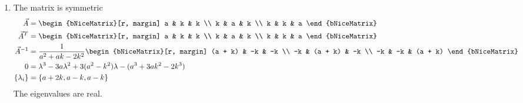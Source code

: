 \begin{enumerate}
    \item The matrix is symmetric
          \begin{align}
              \vec{A}       & = \begin{bNiceMatrix}[r, margin]
                                    a & k & k \\
                                    k & a & k \\
                                    k & k & a
                                \end{bNiceMatrix}                 \\
              \vec{A}^T     & = \begin{bNiceMatrix}[r, margin]
                                    a & k & k \\
                                    k & a & k \\
                                    k & k & a
                                \end{bNiceMatrix}                 \\
              \vec{A}^{-1}  & =
              \frac{1}{a^2 + ak - 2k^2} \begin{bNiceMatrix}[r, margin]
                                            (a + k) & -k      & -k      \\
                                            -k      & (a + k) & -k      \\
                                            -k      & -k      & (a + k)
                                        \end{bNiceMatrix}         \\
              0             & = \lambda^3 - 3a\lambda^2 + 3(a^2 - k^2)\lambda
              - (a^3 + 3ak^2 - 2k^3)                                          \\
              \{\lambda_i\} & = \{a + 2k, a-k, a-k\}
          \end{align}
          The eigenvalues are real.


\end{enumerate}
